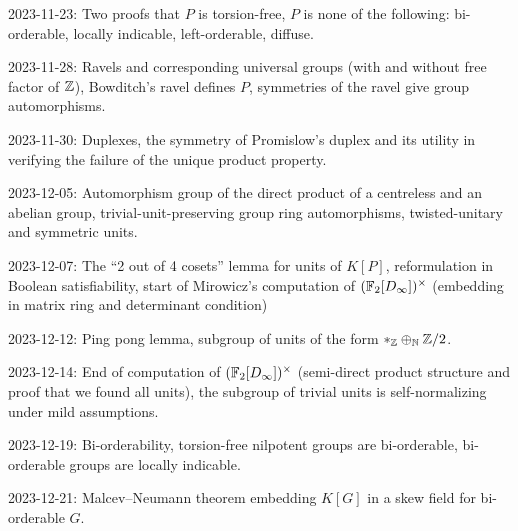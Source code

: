 2023-11-23: Two proofs that $P$ is torsion-free, $P$ is none of the following: bi-orderable, locally indicable, left-orderable, diffuse.

2023-11-28: Ravels and corresponding universal groups (with and without free factor of $\mathbb{Z}$), Bowditch's ravel defines $P$, symmetries of the ravel give group automorphisms.

2023-11-30: Duplexes, the symmetry of Promislow's duplex and its utility in verifying the failure of the unique product property.

2023-12-05: Automorphism group of the direct product of a centreless and an abelian group, trivial-unit-preserving group ring automorphisms, twisted-unitary and symmetric units.

2023-12-07: The ``2 out of 4 cosets'' lemma for units of $K[P]$, reformulation in Boolean satisfiability, start of Mirowicz's computation of $(\mathbb{F}_2[D_\infty])^\times$ (embedding in matrix ring and determinant condition)

2023-12-12: Ping pong lemma, subgroup of units of the form $\ast_{\mathbb{Z}} \oplus_{\mathbb{N}} \mathbb{Z} / 2$.

2023-12-14: End of computation of $(\mathbb{F}_2[D_\infty])^\times$ (semi-direct product structure and proof that we found all units), the subgroup of trivial units is self-normalizing under mild assumptions.

2023-12-19: Bi-orderability, torsion-free nilpotent groups are bi-orderable, bi-orderable groups are locally indicable.

2023-12-21: Malcev--Neumann theorem embedding $K[G]$ in a skew field for bi-orderable $G$.
